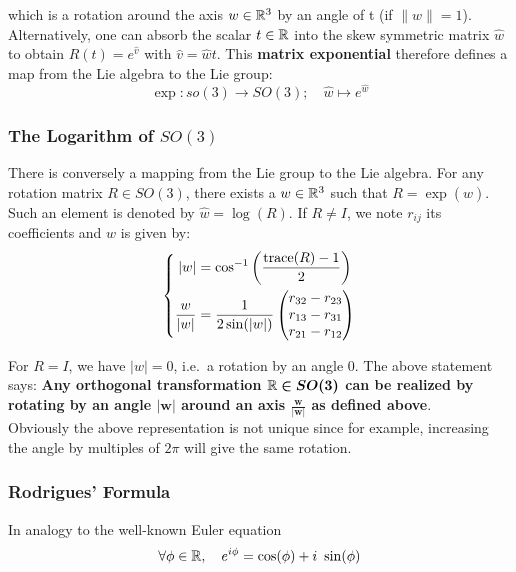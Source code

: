 which is a rotation around the axis $w \in \mathbb{R}^3$
by an angle of t (if $\|w\| = 1$). Alternatively, one can absorb
the scalar $t \in \mathbb{R}$ into the skew  symmetric matrix $\widehat{w}$
to obtain $R(t) = e^{\widehat{v}}$ with $\widehat{v} = \widehat{w}t$.
This \textbf{matrix exponential} therefore defines a map from
the Lie algebra to the Lie group:
	\[\exp : so(3) \rightarrow SO(3);\quad \widehat{w}\mapsto e^{\widehat{w}}\]


\subsubsection{The Logarithm of $SO(3)$}%
\label{ssub:the_logarithm_of_so_3_}

There is conversely a mapping from the Lie group to the Lie algebra.
For any rotation matrix $R \in SO(3)$, there exists a $w \in \mathbb{R}^3$
such that $R = \exp(\widehat{w})$. Such an element is denoted by
$\widehat{w} = \log(R)$. If $R \ne I$, we note $r_{ij}$ its coefficients
and $w$ is given by:
	\[\left\{ \begin{aligned}
		|w| &= \cos^{-1}\left(\frac{\text{trace}(R)-1}{2}\right)\\
		\frac{w}{|w|} &= \frac{1}{2\sin(|w|)}
			\begin{pmatrix}
				r_{32} - r_{23} \\
				r_{13} - r_{31} \\
				r_{21} - r_{12} \\
			\end{pmatrix}
	\end{aligned}\right.\]

For $R = I$, we have $|w| = 0$, i.e.\ a rotation by an angle 0.
The above statement says:
\textbf{Any orthogonal transformation $\bm{\mathbb{R} \in SO(3)}$ can be realized
by rotating by an angle $\bm{|w|}$ around an axis
$\bm{\frac{w}{|w|}}$ as defined above}.\\

Obviously the above representation is not unique since for example,
increasing the angle by multiples of $2\pi$ will give the same rotation.


\subsubsection{Rodrigues' Formula}%
\label{ssub:rodrigues_formula}

In analogy to the well-known Euler equation
	\[\forall \phi \in \mathbb{R}, \quad  e^{i\phi} = \cos(\phi) + i\ \sin(\phi)\]

